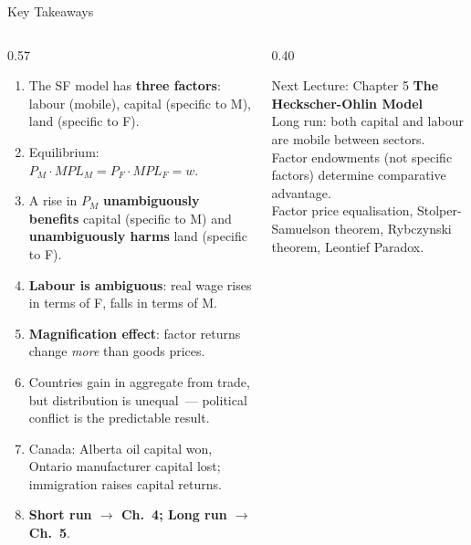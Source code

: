 \documentclass[aspectratio=169]{beamer}
\begin{document}
\begin{frame}[shrink=15]{Key Takeaways}
\begin{columns}[T]
\begin{column}{0.57\textwidth}
\begin{enumerate}\small
  \item The SF model has \textbf{three factors}: labour
        (mobile), capital (specific to M), land (specific
        to F).
  \item Equilibrium: $P_M\cdot MPL_M = P_F\cdot MPL_F
        = w$.
  \item A rise in $P_M$ \textbf{unambiguously benefits}
        capital (specific to M) and \textbf{unambiguously
        harms} land (specific to F).
  \item \textbf{Labour is ambiguous}: real wage rises in
        terms of F, falls in terms of M.
  \item \textbf{Magnification effect}: factor returns
        change \emph{more} than goods prices.
  \item Countries gain in aggregate from trade, but
        distribution is unequal~--- political conflict
        is the predictable result.
  \item Canada: Alberta oil capital won, Ontario
        manufacturer capital lost; immigration raises
        capital returns.
  \item \textbf{Short run $\to$ Ch.~4; Long run
        $\to$ Ch.~5}.
\end{enumerate}
\end{column}
\begin{column}{0.40\textwidth}
\begin{block}{Next Lecture: Chapter 5}
\textbf{The Heckscher-Ohlin Model}\\[0.3em]
\small Long run: both capital and labour are mobile
between sectors.\\[0.2em]
Factor endowments (not specific factors) determine
comparative advantage.\\[0.2em]
Factor price equalisation, Stolper-Samuelson theorem,
Rybczynski theorem, Leontief Paradox.
\end{block}
\end{column}
\end{columns}
\end{frame}
\end{document}
